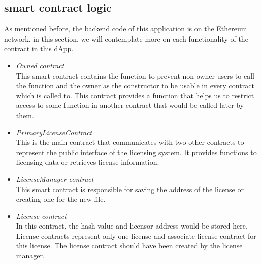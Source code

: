 \subsection{smart contract logic}
As mentioned before, the backend code of this application is on the Ethereum network. in this section, we will contemplate more on each functionality of the contract in this dApp.
\begin{itemize}
	\item \textit{Owned contract} \\
	This smart contract contains the function to prevent non-owner users to call the function and the owner as the constructor to be usable in every contract which is called to. This contract provides a function that helps us to restrict access to some function in another contract that would be called later by them. \\
	\item \textit{PrimaryLicenseContract} \\
	This is the main contract that communicates with two other contracts to represent the public interface of the licensing system. It provides functions to licensing data or retrieves license information. \\
   \item \textit{LicenseManager contract} \\
	This smart contract is responsible for saving the address of the license or creating one for the new file. \\
	\item \textit{License contract} \\
	In this contract, the hash value and licensor address would be stored here. License contracts represent only one license and associate license contract for this license. The license contract should have been created by the license manager.

\end{itemize}

